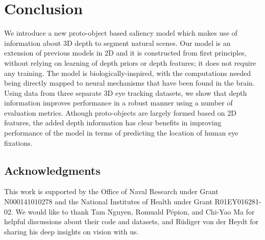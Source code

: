 \documentclass[12pt]{article}
\begin{document}
\section*{Conclusion}
We introduce a new proto-object based saliency model which makes use
of information about 3D depth to segment natural scenes.  Our
model is an extension of previous models in 2D and it is constructed
from first principles, without relying on learning of depth priors or
depth features; it does not require any training. The model is
biologically-inspired, with the computations needed being directly
mapped to neural mechanisms that have been found in the brain.
Using data from three separate 3D
eye tracking datasets, we show that depth information improves
performance in a robust manner using a number of evaluation
metrics. Athough proto-objects are largely formed
based on 2D features, the added depth information has clear benefits
in improving performance of the model in terms of predicting the
location of human eye fixations. 

\clearpage

\subsection*{Acknowledgments}
This work is supported by the Office of Naval Research under Grant
N000141010278 and the National Institutes of Health under Grant
R01EY016281-02. We would like to thank Tam Nguyen, Romuald P\'epion,
and Chi-Yao Ma for helpful discussions about their code and datasets,
and R\"udiger von der Heydt for sharing his deep insights on vision
with us. 
\clearpage





\end{document}
